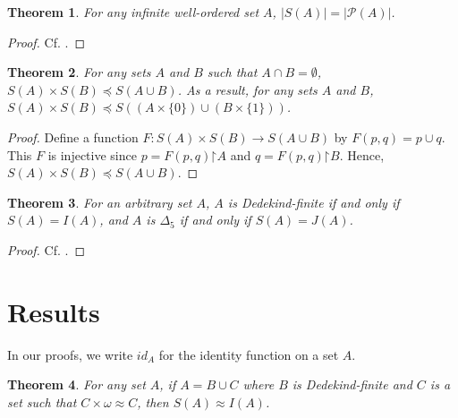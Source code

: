 \documentclass[a4paper,12pt,review]{article} %
\newtheorem{thm}{Theorem}[section]
\theoremstyle{definition}
\numberwithin{equation}{section}
\renewcommand{\restriction}{\mathord{\upharpoonright}}
\begin{document}
\begin{thm}
For any infinite well-ordered set $A$, $|S(A)| = |\mathcal{P}(A)|$.
\end{thm}

\begin{proof}
Cf. \cite[Theorem 1.2]{DH}.
\end{proof}

\begin{thm}
    For any sets $A$ and $B$ such that $A\cap B=\emptyset$, $S(A)\times S(B)\preceq S(A\cup B)$. As a result, for any sets $A$ and $B$, $S(A)\times S(B)\preceq S((A\times\{0\})\cup (B\times\{1\}))$.
\end{thm}

\begin{proof}
    Define a function $F:S(A)\times S(B)\to S(A\cup B)$ by $F(p,q)=p\cup q$. This $F$ is injective since $p=F(p,q)\restriction A$ and $q=F(p,q)\restriction B$. Hence, $S(A)\times S(B)\preceq S(A\cup B)$.
\end{proof}

\begin{thm}
    For an arbitrary set $A$, $A$ is Dedekind-finite if and only if $S(A)=I(A)$, and $A$ is $\Delta_{5}$ if and only if $S(A)=J(A)$.
\end{thm}

\begin{proof}
    Cf. \cite[Theorem 3.2 and 3.3]{my}.
\end{proof}

\section{Results}

\noindent In our proofs, we write $id_{A}$ for the identity function on a set $A$.

\begin{thm}
    For any set $A$, if $A=B\cup C$ where $B$ is Dedekind-finite and $C$ is a set such that $C\times\omega\approx C$, then $S(A)\approx I(A)$.
\end{thm}
\end{document}
